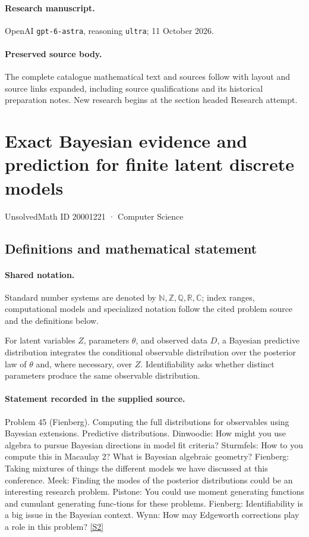 \documentclass[11pt]{article}
\begin{document}
\paragraph{Research manuscript.} OpenAI \texttt{gpt-6-astra}, reasoning \texttt{ultra}; 11 October 2026.
\paragraph{Preserved source body.} The complete catalogue mathematical text and sources follow with layout and source links expanded, including source qualifications and its historical preparation notes. New research begins at the section headed Research attempt.

\section{Exact Bayesian evidence and prediction for finite latent discrete models}\label{20001221}
{\small UnsolvedMath ID 20001221 · Computer Science}
\subsection{Definitions and mathematical statement}

\paragraph{Shared notation.}Standard number systems are denoted by $\mathbb N,\mathbb Z,\mathbb Q,\mathbb R,\mathbb C$; index ranges, computational models and specialized notation follow the cited problem source and the definitions below.


For latent variables $Z$, parameters $\theta$, and observed data $D$, a Bayesian predictive distribution integrates the conditional observable distribution over the posterior law of $\theta$ and, where necessary, over $Z$. Identifiability asks whether distinct parameters produce the same observable distribution.
\paragraph{Statement recorded in the supplied source.}
Problem 45 (Fienberg). Computing the full distributions for observables using Bayesian extensions. Predictive distributions. Dinwoodie: How might you use algebra to pursue Bayesian directions in model fit criteria? Sturmfels: How to you compute this in Macaulay 2? What is Bayesian algebraic geometry? Fienberg: Taking mixtures of things the different models we have discussed at this conference. Meek: Finding the modes of the posterior distributions could be an interesting research problem. Pistone: You could use moment generating functions and cumulant generating func-tions for these problems. Fienberg: Identifiability is a big issue in the Bayesian context. Wynn: How may Edgeworth corrections play a role in this problem? \href{https://aimath.org/WWN/compalgstat/compalgstat.pdf}{[S2]}
\end{document}
